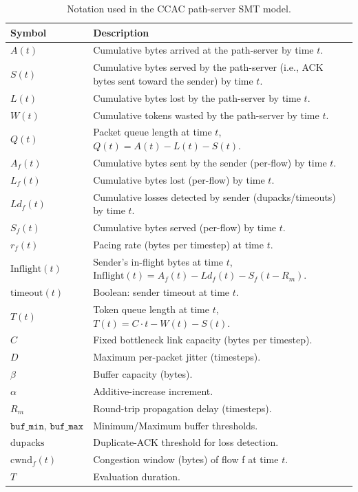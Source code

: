 \documentclass[12pt]{l4dc2023}
\begin{document}
\begin{table}[ht]
\centering
\begin{tabular}{@{}ll@{}}
\toprule
\textbf{Symbol} & \textbf{Description} \\
\midrule
\(A(t)\) & Cumulative bytes arrived at the path-server by time \(t\). \\
\(S(t)\) & Cumulative bytes served by the path-server (i.e., ACK bytes sent toward the sender) by time \(t\). \\
\(L(t)\) & Cumulative bytes lost by the path-server by time \(t\). \\
\(W(t)\) & Cumulative tokens wasted by the path-server by time \(t\). \\
\(Q(t)\) & Packet queue length at time \(t\), \(Q(t)=A(t)-L(t)-S(t)\). \\
\(A_f(t)\) & Cumulative bytes sent by the sender (per-flow) by time \(t\). \\
\(L_f(t)\) & Cumulative bytes lost (per-flow) by time \(t\). \\
\(Ld_f(t)\) & Cumulative losses detected by sender (dupacks/timeouts) by time \(t\). \\
\(S_f(t)\) & Cumulative bytes served (per-flow) by time \(t\). \\
\(r_f(t)\) & Pacing rate (bytes per timestep) at time \(t\). \\
\(\mathrm{Inflight}(t)\) & Sender's in-flight bytes at time \(t\), \(\mathrm{Inflight}(t)=A_f(t)-Ld_f(t)-S_f(t-R_m)\). \\
\(\mathrm{timeout}(t)\) & Boolean: sender timeout at time \(t\). \\
\(T(t)\) & Token queue length at time \(t\), \(T(t)=C\cdot t - W(t) - S(t)\). \\
\(C\) & Fixed bottleneck link capacity (bytes per timestep). \\
\(D\) & Maximum per-packet jitter (timesteps). \\
\(\beta\) & Buffer capacity (bytes). \\
\(\alpha\) & Additive-increase increment. \\
\(R_m\) & Round-trip propagation delay (timesteps). \\
\(\mathtt{buf\_min},\,\mathtt{buf\_max}\) & Minimum/Maximum buffer thresholds. \\
\(\mathrm{dupacks}\) & Duplicate-ACK threshold for loss detection. \\
\(\mathrm{cwnd}_f(t)\) & Congestion window (bytes) of flow f at time \(t\). \\
\(T\)& Evaluation duration. \\
\bottomrule
\end{tabular}
\caption{Notation used in the CCAC path-server SMT model.}
\label{tab:notation}
\end{table}
\end{document}
